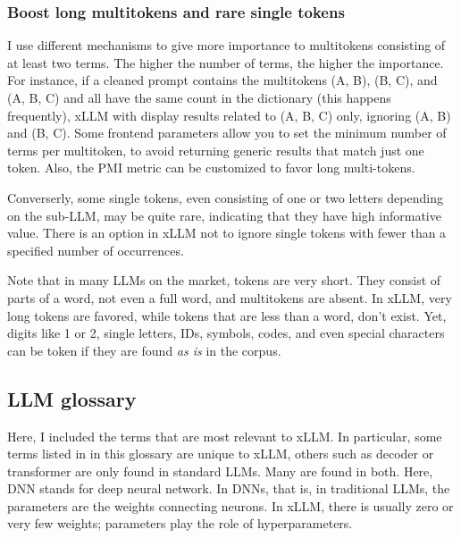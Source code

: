\documentclass[10pt]{article}
\begin{document}
{\subsubsection{Boost long multitokens and rare single tokens}

I use different mechanisms to give more importance to multitokens consisting of at least two terms. The higher the number of terms, the higher the importance. For instance, if a cleaned prompt contains the multitokens (A, B), (B, C), and (A, B, C) and all have the same count in the dictionary (this happens frequently), xLLM with display results related to (A, B, C) only, ignoring (A, B) and (B, C). Some 
 frontend parameters allow you to set the minimum number of terms per multitoken, to avoid returning generic results that match just one token. Also, the PMI metric can be customized to favor long multi-tokens. 

Converserly, some single tokens, even consisting of one or two letters depending on the sub-LLM, may be quite rare, indicating that they have high informative value. There is an option in xLLM not to ignore single tokens with fewer than a specified number of occurrences.

Note that in many LLMs on the market, tokens are very short. They consist of parts of a word, not even a full word, 
and multitokens are absent. In xLLM, very long tokens are favored, while tokens that are less than a word, don't exist. Yet, digits like 1 or 2, single letters, IDs, symbols, codes, and even special characters can be token if they are found {\em as is} in the corpus.




\subsection{LLM glossary}

% 

Here, I included the terms that are most relevant to xLLM. In particular, some terms listed in in this glossary are unique to xLLM,
 others such as decoder or transformer are only found in standard LLMs. Many are found in both. Here, DNN stands for deep neural network. In DNNs, that is, in traditional LLMs, the parameters are the weights connecting neurons. In xLLM, there is usually 
 zero or very few weights; parameters play the role of hyperparameters. 

}
\end{document}
